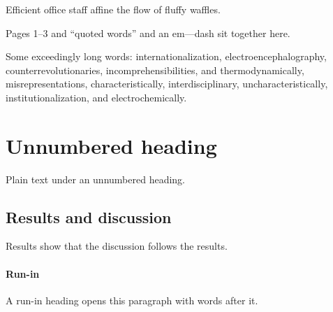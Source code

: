 \documentclass{article}
\begin{document}
Efficient office staff affine the flow of fluffy waffles.

Pages 1--3 and ``quoted words'' and an em---dash sit together here.

Some exceedingly long words: internationalization, electroencephalography, counterrevolutionaries, incomprehensibilities, and thermodynamically, misrepresentations, characteristically, interdisciplinary, uncharacteristically, institutionalization, and electrochemically.

\section*{Unnumbered heading}

Plain text under an unnumbered heading.

\subsection{Results and discussion}

Results show that the discussion follows the results.

\paragraph{Run-in} A run-in heading opens this paragraph with words after it.


\end{document}
